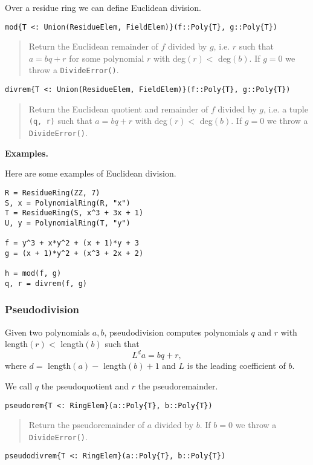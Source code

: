 \documentclass[a4paper,10pt]{article}
\newcommand{\code}{\lstinline}
\newcommand{\desc}[1]{\vspace{-3mm}\begin{quote}#1\end{quote}}
\begin{document}
Over a residue ring we can define Euclidean division.

\begin{lstlisting}
mod{T <: Union(ResidueElem, FieldElem)}(f::Poly{T}, g::Poly{T})
\end{lstlisting}

\desc{Return the Euclidean remainder of $f$ divided by $g$, i.e. $r$ such 
that $a = bq + r$ for some polynomial $r$ with deg$(r) <$ deg$(b)$. If 
$g = 0$ we throw a \code{DivideError()}.}

\begin{lstlisting}
divrem{T <: Union(ResidueElem, FieldElem)}(f::Poly{T}, g::Poly{T})
\end{lstlisting}

\desc{Return the Euclidean quotient and remainder of $f$ divided by $g$, i.e.
a tuple \code{(q, r)} such that $a = bq + r$ with deg$(r) <$ deg$(b)$. If 
$g = 0$ we throw a \code{DivideError()}.}

\textbf{Examples.}

Here are some examples of Euclidean division.

\begin{lstlisting}
R = ResidueRing(ZZ, 7)
S, x = PolynomialRing(R, "x")
T = ResidueRing(S, x^3 + 3x + 1)
U, y = PolynomialRing(T, "y")

f = y^3 + x*y^2 + (x + 1)*y + 3
g = (x + 1)*y^2 + (x^3 + 2x + 2)

h = mod(f, g)
q, r = divrem(f, g)
\end{lstlisting}

\subsubsection{Pseudodivision}

Given two polynomials $a, b$, pseudodivision computes polynomials $q$ and $r$
with length$(r) <$ length$(b)$ such that
$$L^d a = bq + r,$$
where $d =$ length$(a) -$ length$(b) + 1$ and $L$ is the leading coefficient
of $b$.

We call $q$ the pseudoquotient and $r$ the pseudoremainder.

\begin{lstlisting}
pseudorem{T <: RingElem}(a::Poly{T}, b::Poly{T})
\end{lstlisting}

\desc{Return the pseudoremainder of $a$ divided by $b$. If $b = 0$ we throw a 
\code{DivideError()}.}

\begin{lstlisting}
pseudodivrem{T <: RingElem}(a::Poly{T}, b::Poly{T})
\end{lstlisting}
\end{document}
